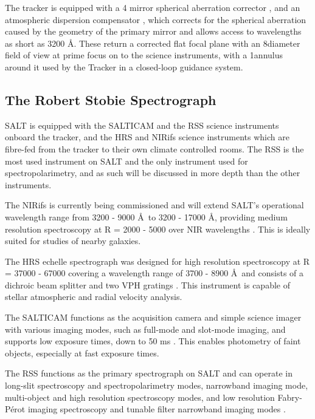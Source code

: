 
The tracker is equipped with a 4 mirror spherical aberration corrector \citep{SALT_SAC}, and an atmospheric dispersion compensator \citep{SALT_ADC}, which corrects for the spherical aberration caused by the geometry of the primary mirror and allows access to wavelengths as short as 3200 \AA. These return a corrected flat focal plane with an 8\arcmin diameter field of view at prime focus on to the science instruments, with a 1\arcmin annulus around it used by the Tracker in a closed-loop guidance system.
\prgph

\subsection{The Robert Stobie Spectrograph}

SALT is equipped with the \gls{SALTICAM} and the \gls{RSS} science instruments onboard the tracker, and the \gls{HRS} and \gls{NIRifs} science instruments which are fibre-fed from the tracker to their own climate controlled rooms. The \gls{RSS} is the most used instrument on \gls{SALT} and the only instrument used for spectropolarimetry, and as such will be discussed in more depth than the other instruments.

The \gls{NIRifs} is currently being commissioned and will extend SALT's operational wavelength range from 3200 - 9000 \AA\ to 3200 - 17000 \AA, providing medium resolution spectroscopy at R = 2000 - 5000 over NIR wavelengths \citep{NIR, SALT_NIR}. This is ideally suited for studies of nearby galaxies.

The \gls{HRS} echelle spectrograph was designed for high resolution spectroscopy at R = 37000 - 67000 covering a wavelength range of 3700 - 8900 \AA\ and consists of a dichroic beam splitter and two \gls{VPH} gratings \citep{SALT_hires}. This instrument is capable of stellar atmospheric and radial velocity analysis.

The SALTICAM functions as the acquisition camera and simple science imager with various imaging modes, such as full-mode and slot-mode imaging, and supports low exposure times, down to 50 ms \citep{SALTICAM}. This enables photometry of faint objects, especially at fast exposure times.
\prgph

The \gls{RSS} functions as the primary spectrograph on \gls{SALT} and can operate in long-slit spectroscopy and spectropolarimetry modes, narrowband imaging mode, multi-object and high resolution spectroscopy modes, and low resolution Fabry-P\'erot imaging spectroscopy and tunable filter narrowband imaging modes \citep[for an in-depth discussion on operational modes see][]{SALT_operational_modes}.
\prgph

